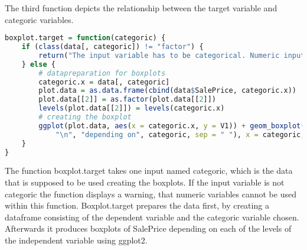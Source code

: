 The third function depicts the relationship between the target variable and categoric variables. 
\begin{lstlisting}[language=R]
boxplot.target = function(categoric) {
    if (class(data[, categoric]) != "factor") {
        return("The input variable has to be categorical. Numeric input does not work!")
    } else {
        # datapreparation for boxplots
        categoric.x = data[, categoric]
        plot.data = as.data.frame(cbind(data$SalePrice, categoric.x))
        plot.data[[2]] = as.factor(plot.data[[2]])
        levels(plot.data[[2]]) = levels(categoric.x)
        # creating the boxplot
        ggplot(plot.data, aes(x = categoric.x, y = V1)) + geom_boxplot() + labs(title = paste("Boxplots of SalePrice", 
            "\n", "depending on", categoric, sep = " "), x = categoric, y = "SalePrice")
    }
}
\end{lstlisting}
The function boxplot.target takes one input named categoric, which is the data that is supposed to be used creating the boxplots. If the input variable is not categoric the function displays a warning, that numeric variables cannot be used within this function. Boxplot.target prepares the data first, by creating a dataframe consisting of the dependent variable and the categoric variable chosen. Afterwards it produces boxplots of SalePrice depending on each of the levels of the independent variable using ggplot2.